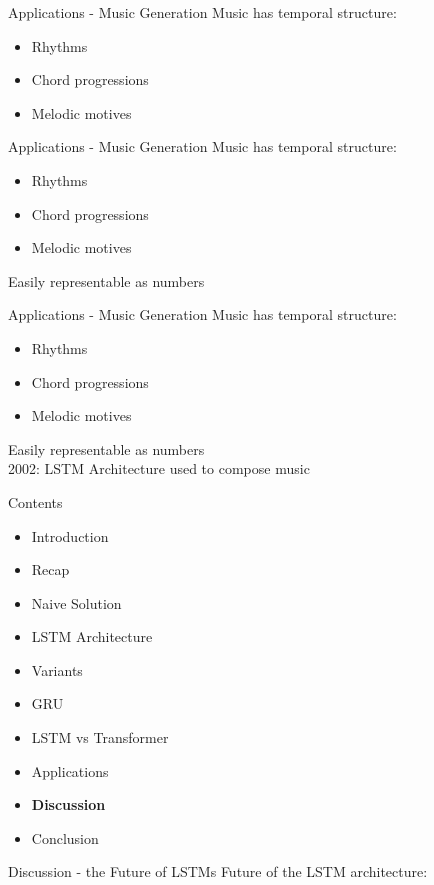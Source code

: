 \documentclass[10pt, aspectratio=169]{beamer}
\begin{document}
\begin{frame}[t]{Applications - Music Generation}
Music has temporal structure:
\begin{itemize}
    \item Rhythms
    \item Chord progressions
    \item Melodic motives
\end{itemize}
\end{frame}

\begin{frame}[t]{Applications - Music Generation}
Music has temporal structure:
\begin{itemize}
    \item Rhythms
    \item Chord progressions
    \item Melodic motives
\end{itemize}
Easily representable as numbers
\end{frame}

\begin{frame}[t]{Applications - Music Generation}
Music has temporal structure:
\begin{itemize}
    \item Rhythms
    \item Chord progressions
    \item Melodic motives
\end{itemize}
Easily representable as numbers\\
2002: LSTM Architecture used to compose music
\end{frame}

\begin{frame}[t]{Contents}
\begin{itemize}
    \item Introduction
    \item Recap
    \item Naive Solution
    \item LSTM Architecture
    \item Variants
    \item GRU
    \item LSTM vs Transformer
    \item Applications
    \item \textbf{Discussion}
    \item Conclusion
\end{itemize}
\end{frame}
\begin{frame}[t]{Discussion - the Future of LSTMs}
Future of the LSTM architecture:
\end{frame}
\end{document}
